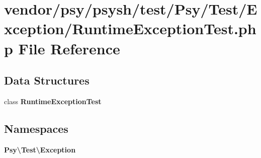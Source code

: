 \section{vendor/psy/psysh/test/\+Psy/\+Test/\+Exception/\+Runtime\+Exception\+Test.php File Reference}
\label{_runtime_exception_test_8php}
\subsection*{Data Structures}
\begin{DoxyCompactItemize}
\item 
class {\bf Runtime\+Exception\+Test}
\end{DoxyCompactItemize}
\subsection*{Namespaces}
\begin{DoxyCompactItemize}
\item 
 {\bf Psy\textbackslash{}\+Test\textbackslash{}\+Exception}
\end{DoxyCompactItemize}
